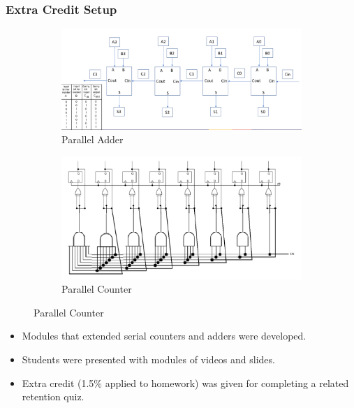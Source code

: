 \documentclass{beamer}
\begin{document}
\begin{frame}
    \frametitle{Extra Credit Setup}

    \begin{figure}[htbp]
      \centering
      \begin{subfigure}[b]{0.45\textwidth}
        \centering
        \includegraphics[width=\linewidth]{parallel_add.png}
        \caption{Parallel Adder}
        \label{fig:subfig1}
      \end{subfigure}
      \hfill
      \begin{subfigure}[b]{0.45\textwidth}
        \centering
        \includegraphics[width=\linewidth]{parallel_counter.png}
        \caption{Parallel Counter}
        \label{fig:subfig2}
      \end{subfigure}
    \end{figure}

    \begin{itemize}
        \item Modules that extended serial counters and adders were developed.
        \item Students were presented with modules of videos and slides.
        \item Extra credit (1.5\% applied to homework) was given for completing a related retention quiz.
    \end{itemize}
     
\end{frame}
\end{document}
